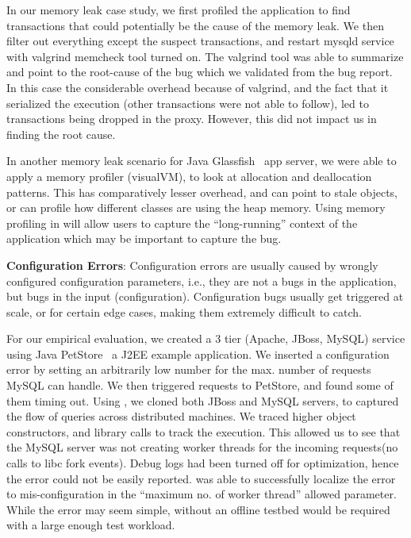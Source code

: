 In our memory leak case study, we first profiled the application to find transactions that could potentially be the cause of the memory leak. 
We then filter out everything except the suspect transactions, and restart mysqld service with valgrind memcheck tool turned on.
The valgrind tool was able to summarize and point to the root-cause of the bug which we validated from the bug report.
In this case the considerable overhead because of valgrind, and the fact that it serialized the execution (other transactions were not able to follow), led to transactions being dropped in the proxy. 
However, this did not impact us in finding the root cause.

In another memory leak scenario for Java Glassfish~\cite{glassfish} app server, we were able to apply a memory profiler (visualVM), to look at allocation and deallocation patterns.
This has comparatively lesser overhead, and can point to stale objects, or can profile how different classes are using the heap memory.
Using memory profiling in \parikshan will allow users to capture the ``long-running'' context of the application which may be important to capture the bug.
\fi

\noindent
\textbf{Configuration Errors}:
Configuration errors are usually caused by wrongly configured configuration parameters, i.e., they are not a bugs in the application, but bugs in the input (configuration).
Configuration bugs usually get triggered at scale, or for certain edge cases, making them extremely difficult to catch.

For our empirical evaluation, we created a 3 tier (Apache, JBoss, MySQL) service using Java PetStore~\cite{petstore} a J2EE example application.
We inserted a configuration error by setting an arbitrarily low number for the max. number of requests MySQL can handle.
We then triggered requests to PetStore, and found some of them timing out.
Using \parikshan, we cloned both JBoss and MySQL servers, to captured the flow of queries across distributed machines.
We traced higher object constructors, and library calls to track the execution.
This allowed us to see that the MySQL server was not creating worker threads for the incoming requests(no calls to libc fork events).
Debug logs had been turned off for optimization, hence the error could not be easily reported. 
\parikshan was able to successfully localize the error to mis-configuration in the ``maximum no. of worker thread'' allowed parameter.
While the error may seem simple, without \parikshan an offline testbed would be required with a large enough test workload.


